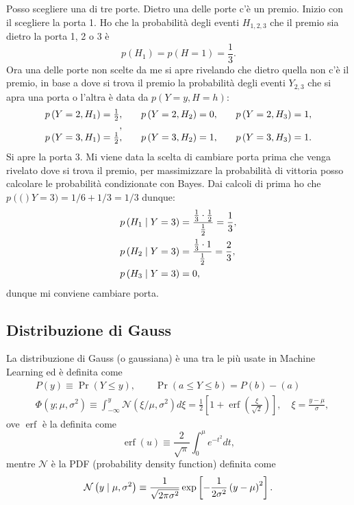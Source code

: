 \documentclass[10pt]{article}
\DeclareMathOperator{\pr}{Pr}
\DeclareMathOperator{\erf}{erf}
\newcommand{\pare}[1]{
	\ensuremath{\left(#1\right)}
}
\newcommand{\spare}[1]{
	\ensuremath{\left[#1\right]}
}
\begin{document}
\begin{example}
Posso scegliere una di tre porte. Dietro una delle porte c'è un premio. Inizio
con il scegliere la porta 1. Ho che la probabilità degli eventi $H_{1,2,3}$ che
il premio sia dietro la porta 1, 2 o 3 è
\[
p\pare{H_1} = p\pare{H=1} = \frac{1}{3}.
\]
Ora una delle porte non scelte da me si apre rivelando che dietro quella non c'è
il premio, in base a dove si trova il premio la probabilità degli eventi $Y_{2,
3}$ che si apra una porta o l'altra è data da $p\pare{Y=y, H=h}$:
\[
\begin{array}{l@{,\qquad}l@{,\qquad}l}
p\pare{Y=2, H_1} = \frac{1}{2} & p\pare{Y=2, H_2} = 0 & p\pare{Y=2, H_3} = 1, \\
\\
p\pare{Y=3, H_1} = \frac{1}{2} & p\pare{Y=3, H_2} = 1 & p\pare{Y=3, H_3} = 1. \\
\end{array}
\]
Si apre la porta 3. Mi viene data la scelta di cambiare porta prima che venga
rivelato dove si trova il premio, per massimizzare la probabilità di vittoria
posso calcolare le probabilità condizionate con Bayes. Dai calcoli di prima ho
che $p\pare(Y=3) = 1/6 + 1/3 = 1/3$ dunque:
\begin{equation}
\begin{split}
p\pare{H_1\cond Y=3} &= \dfrac{\frac{1}{3}\cdot\frac{1}{2}}{\frac{1}{2}} = \frac{1}{3}, \\
p\pare{H_2\cond Y=3} &= \dfrac{\frac{1}{3}\cdot 1}{\frac{1}{2}} = \frac{2}{3}, \\
p\pare{H_3\cond Y=3} &= 0, \\
\end{split}
\end{equation}
dunque mi conviene cambiare porta.
\end{example}

\subsection{Distribuzione di Gauss}
La distribuzione di Gauss (o gaussiana) è una tra le più usate in Machine Learning ed è definita come
\begin{equation}
\begin{split}
&P\pare{y} \equiv \pr\pare{Y\leq y},\qquad \pr\pare{a \leq Y \leq b} = P\pare{b} - \pare{a} \\
&\Phi\pare{y;\mu, \sigma^2} \equiv \int_{-\infty}^y \mathcal{N}\pare{\xi/\mu, \sigma^2}d\xi = \frac{1}{2}\spare{1 + \erf\pare{\frac{\xi}{\sqrt{2}}}},\quad \xi = \frac{y - \mu}{\sigma},
\end{split}
\end{equation}
ove $\erf$ è la  definita come
\begin{equation}
\erf\pare{u} \equiv \frac{2}{\sqrt{\pi}} \int_0^\mu e^{-t^2}dt,
\end{equation}
mentre $\mathcal{N}$ è la PDF (probability density function) definita come
\begin{equation}
\mathcal{N}\pare{y\cond\mu,\sigma^2} \equiv \frac{1}{\sqrt{2\pi\sigma^2}}\exp\spare{-\frac{1}{2\sigma^2}\pare{y-\mu}^2}.
\end{equation}
\end{document}
